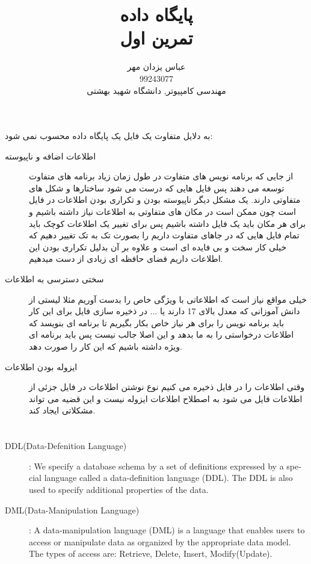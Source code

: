 \documentclass[a4paper]{article}
\newcommand{\fulltitle}[2]{\title{#1 \\ #2}}
\newcommand{\myinf}{\author{عباس یزدان مهر \\ 99243077 \\ مهندسی کامپیوتر, دانشگاه شهید بهشتی}}
\begin{document}
\fulltitle{
پایگاه داده
}{
تمرین اول
}

\myinf

\maketitle

\newpage


\section{}
به دلایل متفاوت یک فایل یک پایگاه داده محسوب نمی شود:
\begin{description}
	\item[اطلاعات اضافه و ناپیوسته]
از جایی که برنامه نویس های متفاوت در طول زمان زیاد برنامه های متفاوت توسعه می دهند پس فایل هایی که درست می شود ساختارها و شکل های متفاوتی دارند. یک مشکل دیگر ناپیوسته بودن و تکراری بودن اطلاعات در فایل است چون ممکن است در مکان های متفاوتی به اطلاعات نیاز داشته باشیم و برای هر مکان باید یک فایل داشته باشیم پس برای تغییر یک اطلاعات کوچک باید تمام فایل هایی که در جاهای متفاوت داریم را بصورت تک به تک تغییر دهیم که خیلی کار سخت و بی فایده ای است و علاوه بر آن بدلیل تکراری بودن این اطلاعات داریم فضای حافظه ای زیادی از دست میدهیم.
	\item[سختی دسترسی به اطلاعات]
خیلی مواقع نیاز است که اطلاعاتی با ویژگی خاص را بدست آوریم مثلا لیستی از دانش آموزانی که معدل بالای 17 دارند یا ... در ذخیره سازی فایل برای این کار باید برنامه نویس را برای هر نیاز خاص بکار بگیریم تا برنامه ای بنویسد که اطلاعات درخواستی را به ما بدهد و این اصلا جالب نیست پس باید برنامه ای ویژه داشته باشیم که این کار را صورت دهد.
	\item[ایزوله بودن اطلاعات]
وقتی اطلاعات را در فایل ذخیره می کنیم نوع نوشتن اطلاعات در فایل جزئی از اطلاعات فایل می شود به اصطلاح اطلاعات ایزوله نیست و این قضیه می تواند مشکلاتی ایجاد کند.
\end{description}

\section{}
\subsection{}
	\begin{latin}
		\begin{description}
			\item[DDL(Data-Defenition Language)]: We specify a database schema by a set of definitions expressed by a special language
called a data-definition language (DDL). The DDL is also used to specify additional
properties of the data.
			\item[DML(Data-Manipulation Language)]: A data-manipulation language (DML) is a language that enables users to access or manipulate data as organized by the appropriate data model. The types of access are: Retrieve, Delete, Insert, Modify(Update).
		\end{description}
	\end{latin}
\end{document}
